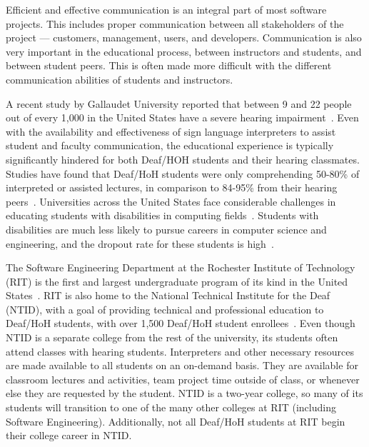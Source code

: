 \documentclass[conference]{IEEEtran}
\newcommand{\dan}[1]{\textcolor{blue}{{\it [Dan says: #1]}}}
\begin{document}
Efficient and effective communication is an integral part of most software projects. This includes proper communication between all stakeholders of the project --- customers, management, users, and developers. Communication is also very important in the educational process, between instructors and students, and between student peers. This is often made more difficult with the different communication abilities of students and instructors.


A recent study by Gallaudet University reported that between 9 and 22 people out of every 1,000 in the United States have a severe hearing impairment~\cite{deaf_stats_url}. Even with the availability and effectiveness of sign language interpreters to assist student and faculty communication, the educational experience is typically significantly hindered for both Deaf/HOH students and their hearing classmates. Studies have found that Deaf/HoH students were only comprehending 50-80\% of interpreted or assisted lectures, in comparison to 84-95\% from their hearing peers~\cite{Marschark_bibtex, Marschark02102008}. Universities across the United States face considerable challenges in educating students with disabilities in computing fields~\cite{Cavender:2009:SAA:1508865.1509043}. Students with disabilities are much less likely to pursue careers in computer science and engineering, and the dropout rate for these students is high~\cite{4418169, national2000women, Bueno:2007:ALA:1268784.1268903}.

The Software Engineering Department at the Rochester Institute of Technology (RIT) is the first and largest undergraduate program of its kind in the United States~\cite{lutz2012instilling}. RIT is also home to the National Technical Institute for the Deaf (NTID), with a goal of providing technical and professional education to Deaf/HoH students, with over 1,500 Deaf/HoH student enrollees~\cite{ntidurl}. Even though NTID is a separate college from the rest of the university, its students often attend classes with hearing students. Interpreters and other necessary resources are made available to all students on an on-demand basis. They are available for classroom lectures and activities, team project time outside of class, or whenever else they are requested by the student. NTID is a two-year college, so many of its students will transition to one of the many other colleges at RIT (including Software Engineering). Additionally, not all Deaf/HoH students at RIT begin their college career in NTID.
\end{document}

